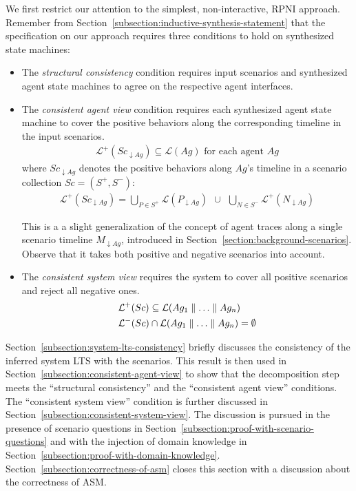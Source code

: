 We first restrict our attention to the simplest, non-interactive, RPNI approach. Remember from Section~\ref{subsection:inductive-synthesis-statement} that the specification on our approach requires three conditions to hold on synthesized state machines:
\begin{itemize}
\item The \emph{structural consistency} condition requires input scenarios and synthesized agent state machines to agree on the respective agent interfaces.
\item The \emph{consistent agent view} condition requires each synthesized agent state machine to cover the positive behaviors along the corresponding timeline in the input scenarios.
\begin{align}
\mathcal{L}^+(Sc_{\downarrow Ag}) \subseteq \mathcal{L}(Ag)\mbox{~for each agent $Ag$}\label{proof:consistent-agent-view}
\end{align}
where $Sc_{\downarrow Ag}$ denotes the positive behaviors along $Ag$'s timeline in a scenario collection $Sc = (S^+, S^-)$:
\begin{align}
\mathcal{L}^+(Sc_{\downarrow Ag}) = \bigcup_{P \in S^+} \mathcal{L}(P_{\downarrow Ag})~~\cup~~\bigcup_{N \in S^{-}} \mathcal{L}^{+}(N_{\downarrow Ag})\label{proof:lemma-sc-projection}
\end{align}

This is a a slight generalization of the concept of agent traces along a single scenario timeline $M_{\downarrow Ag}$, introduced in Section~\ref{section:background-scenarios}. Observe that it takes both positive and negative scenarios into account.
\item The \emph{consistent system view} requires the system to cover all positive scenarios and reject all negative ones. 
\begin{align}
&\mathcal{L}^+(Sc) \subseteq \mathcal{L}(Ag_1 \parallel \ldots \parallel Ag_n)\label{proof:consistent-system-view-1}\\
&\mathcal{L}^-(Sc) \cap      \mathcal{L}(Ag_1 \parallel \ldots \parallel Ag_n) = \emptyset\label{proof:consistent-system-view-2}
\end{align}
\end{itemize}

Section~\ref{subsection:system-lts-consistency} briefly discusses the consistency of the inferred system LTS with the scenarios. This result is then used in Section~\ref{subsection:consistent-agent-view} to show that the decomposition step meets the ``structural consistency'' and the ``consistent agent view'' conditions. The ``consistent system view'' condition is further discussed in Section~\ref{subsection:consistent-system-view}. The discussion is pursued in the presence of scenario questions in Section~\ref{subsection:proof-with-scenario-questions} and with the injection of domain knowledge in Section~\ref{subsection:proof-with-domain-knowledge}. Section~\ref{subsection:correctness-of-asm} closes this section with a discussion about the correctness of ASM.

